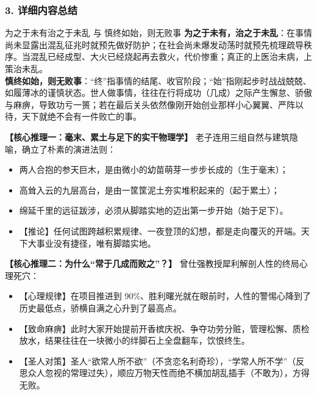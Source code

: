 \subsubsection{3. 详细内容总结}

\begin{ConceptBox}{为之于未有治之于未乱 与 慎终如始，则无败事}
\textbf{为之于未有，治之于未乱}：在事情尚未显露出混乱征兆时就预先做好防护；在社会尚未爆发动荡时就预先梳理疏导秩序。当混乱已经成型、大火已经烧起再去救火，代价惨重；真正的上医治未病，上策治未乱。\\
\textbf{慎终如始，则无败事}：“终”指事情的结尾、收官阶段；“始”指刚起步时战战兢兢、如履薄冰的谨慎状态。世人做事情，往往在行将成功（几成）之际产生懈怠、骄傲与麻痹，导致功亏一篑；若在最后关头依然像刚开始创业那样小心翼翼、严阵以待，天下就绝不会有一件败亡的事。
\end{ConceptBox}

\noindent\textbf{【核心推理一：毫末、累土与足下的实干物理学】}
老子连用三组自然与建筑隐喻，确立了朴素的演进法则：
\begin{itemize}
    \item 两人合抱的参天巨木，是由微小的幼苗萌芽一步步长成的（生于毫末）；
    \item 高耸入云的九层高台，是由一筐筐泥土夯实堆积起来的（起于累土）；
    \item 绵延千里的远征跋涉，必须从脚踏实地的迈出第一步开始（始于足下）。
    \item 【推论】任何试图跨越积累规律、一夜登顶的幻想，都是走向覆灭的开端。天下大事业没有捷径，唯有脚踏实地。
\end{itemize}

\noindent\textbf{【核心推理二：为什么“常于几成而败之”？】}
曾仕强教授犀利解剖人性的终局心理死穴：
\begin{itemize}
    \item 【心理规律】在项目推进到 90\%、胜利曙光就在眼前时，人性的警惕心降到了历史最低点，骄横自满之心升到了最高点。
    \item 【致命麻痹】此时大家开始提前开香槟庆祝、争夺功劳分赃，管理松懈、质检放水，结果往往在一块微小的绊脚石上全盘翻车，饮恨终生。
    \item 【圣人对策】圣人“欲常人所不欲”（不贪恋名利奇珍），“学常人所不学”（反思众人忽视的常理过失），顺应万物天性而绝不横加胡乱插手（不敢为），方得无败。
\end{itemize}

